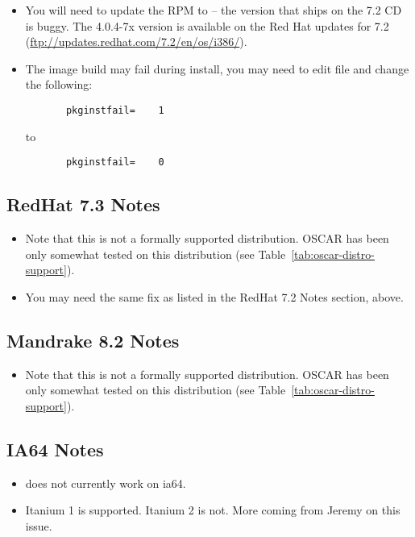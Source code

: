 \begin{itemize}
\item You will need to update the  RPM to
   -- the version that ships on the 7.2 CD is
  buggy.  The 4.0.4-7x version is available on the Red Hat updates for
  7.2 (\url{ftp://updates.redhat.com/7.2/en/os/i386/}).
  
\item The image build may fail during install, you may need to edit
  file  and change
  the following:

\begin{verbatim}
       pkginstfail=    1
\end{verbatim}

  to

\begin{verbatim}
       pkginstfail=    0
\end{verbatim}
\end{itemize}


\subsection{RedHat 7.3 Notes}

\begin{itemize}
\item Note that this is not a formally supported distribution.  OSCAR
  \oscarversion has been only somewhat tested on this distribution
  (see Table~\ref{tab:oscar-distro-support}).

\item You may need the same  fix as listed
  in the RedHat 7.2 Notes section, above.
\end{itemize}


\subsection{Mandrake 8.2 Notes}

\begin{itemize}
\item Note that this is not a formally supported distribution.  OSCAR
  \oscarversion has been only somewhat tested on this distribution
  (see Table~\ref{tab:oscar-distro-support}).
\end{itemize}


\subsection{IA64 Notes}

\begin{itemize}
\item {} does not currently work on ia64.

\item Itanium 1 is supported.  Itanium 2 is not.  More coming from
  Jeremy on this issue.
\end{itemize}
